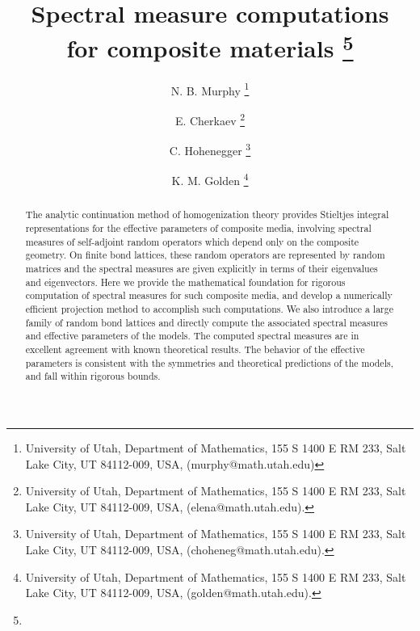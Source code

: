 \documentclass{cmslatex}
\begin{document}
\title{Spectral measure computations \\ for composite materials
\thanks{%
}}
%
\author{N. B. Murphy
\thanks {University of Utah, Department of Mathematics, 155 S 1400 E
  RM 233, Salt Lake City, UT 84112-009, USA, (murphy@math.utah.edu)}
%
\and E. Cherkaev
\thanks {University of Utah, Department of Mathematics, 155 S 1400 E
  RM 233, Salt Lake City, UT 84112-009, USA, (elena@math.utah.edu).}
%
\and C. Hohenegger
\thanks {University of Utah, Department of Mathematics, 155 S 1400 E
  RM 233, Salt Lake City, UT 84112-009, USA, (choheneg@math.utah.edu).}
%
\and K. M. Golden
\thanks {University of Utah, Department of Mathematics, 155 S 1400 E
  RM 233, Salt Lake City, UT 84112-009, USA, (golden@math.utah.edu).}
}



\pagestyle{myheadings} \maketitle

\begin{abstract}
The analytic continuation method of homogenization theory provides
Stieltjes integral representations for the effective parameters of
composite media, involving spectral measures of self-adjoint random
operators which depend only on the composite geometry. On finite bond
lattices, these random operators are represented by random matrices
and the spectral measures are given explicitly in terms of their
eigenvalues and eigenvectors. Here we provide the mathematical
foundation for rigorous computation of spectral measures for such
composite media, and develop a numerically efficient projection method
to accomplish such computations. We also introduce a large family of
random bond lattices and directly compute the associated spectral
measures and effective parameters of the models. The computed spectral
measures are in excellent agreement with known theoretical
results. The behavior of the effective parameters is consistent with
the symmetries and theoretical predictions of the models, and fall
within rigorous bounds.    
\end{abstract}
\end{document}
